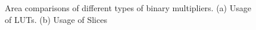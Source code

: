 \documentclass[conference]{IEEEtran}
\begin{document}
\begin{figure}[tbp]
  \centering
  \caption{Area comparisons of different types of binary multipliers. (a) Usage of LUTs. (b) Usage of Slices}
  \label{Fig:OMArea}
\end{figure}
\end{document}
